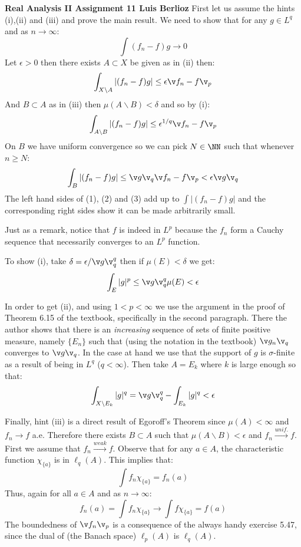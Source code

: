 \noindent\textbf{Real Analysis II Assignment 11 \hspace{\fill} Luis Berlioz}
First let us assume the hints (i),(ii) and (iii) and prove the main result. We need to show that for any $g\in L^q$ and as $n\to \infty$:
$$\int (f_n-f)g\to 0$$
Let $\epsilon>0$ then there exists $A\subset X$ be given as in (ii) then:
\begin{equation}
\int_{X\backslash A} \left| (f_n-f)g\right|\leq \epsilon \v f_n -f\v_p
\end{equation}
And $B\subset A$ as in (iii) then $\mu(A\backslash B)<\delta$ and so by (i):
\begin{equation}
\int_{A\backslash B} \left| (f_n-f)g\right|\leq \epsilon^{1/q}\v f_n-f\v_p
\end{equation}
On $B$ we have uniform convergence so we can pick $N\in \NN$ such that whenever $n\geq N$:
\begin{equation}
\int_{B} \left| (f_n-f)g\right|\leq \v g\v_q\v f_n -f\v_p<\epsilon \v g\v_q 
\end{equation}
The left hand sides of (1), (2) and (3) add up to $\int \left| (f_n-f)g\right|$ and the corresponding right sides show it can be made arbitrarily small.

Just as a remark, notice that $f$ is indeed in $L^p$ because the $f_n$ form a Cauchy sequence that necessarily converges to an $L^p$ function.

To show (i), take $\delta =\epsilon/\v g\v_q^q$ then if $\mu(E)<\delta$ we get:
$$\int_E | g|^p \leq \v g\v^q_q \mu(E) < \epsilon$$

In order to get (ii), and using $1<p<\infty$ we use the argument in the proof of Theorem 6.15 of the textbook, specifically in the second paragraph. 
There the author shows that there is an \emph{increasing} sequence of sets of finite positive measure, namely $\{E_n\}$ such that (using the notation in the textbook) $\v g_n\v_q$  converges to $\v g\v_q$.
In the case at hand we use that the support of $g$ is $\sigma$-finite as a result of being in $L^q$ ($q<\infty$).
 Then take $A=E_k$ where $k$ is large enough so that:
$$\int_{X\backslash E_k} |g|^q = \v g\v_q^q - \int_{E_k} |g|^q<\epsilon$$

Finally, hint (iii) is a direct result of Egoroff's Theorem since $\mu(A)<\infty$ and $f_n \to f$ a.e. Therefore there exists $B\subset A$ such that $\mu(A\backslash B)<\epsilon$ and $f_n\xrightarrow{unif.} f$.
First we assume that $f_n\xrightarrow{weak}f$. Observe that for any $a\in A$, the characteristic function $\chi_{\{a\}}$ is in $\ell_q(A)$. This implies that: 
$$\int f_n \chi_{\{a\}} = f_n(a)$$
Thus, again for all $a\in A$ and as $n\to \infty$:
$$f_n(a) = \int f_n \chi_{\{a\}} \to \int f\chi_{\{a\}}=f(a)$$
The boundedness of $\v f_n \v_p$ is a consequence of the always handy exercise 5.47, since the dual of (the Banach space) $\ell_p(A)$ is $\ell_q(A)$. 

